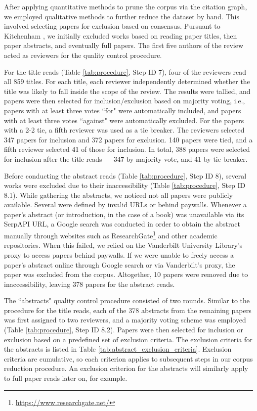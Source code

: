 \documentclass[manuscript,screen,review]{acmart}
\begin{document}
After applying quantitative methods to prune the corpus via the citation graph, we employed qualitative methods to further reduce the dataset by hand. This involved selecting papers for exclusion based on consensus. Pursuant to Kitchenham \cite{kitchenham2004procedures}, we initially excluded works based on reading paper titles, then paper abstracts, and eventually full papers. The first five authors of the review acted as reviewers for the quality control procedure. 

For the title reads (Table \ref{tab:procedure}, Step ID 7), four of the reviewers read all 859 titles. For each title, each reviewer independently determined whether the title was likely to fall inside the scope of the review. The results were tallied, and papers were then selected for inclusion/exclusion based on majority voting, i.e., papers with at least three votes ``for" were automatically included, and papers with at least three votes ``against" were automatically excluded. For the papers with a 2-2 tie, a fifth reviewer was used as a tie breaker. The reviewers selected 347 papers for inclusion and 372 papers for exclusion. 140 papers were tied, and a fifth reviewer selected 41 of those for inclusion. In total, 388 papers were selected for inclusion after the title reads --- 347 by majority vote, and 41 by tie-breaker.

Before conducting the abstract reads (Table \ref{tab:procedure}, Step ID 8), several works were excluded due to their inaccessibility (Table \ref{tab:procedure}, Step ID 8.1). While gathering the abstracts, we noticed not all papers were publicly available. Several were defined by invalid URLs or behind paywalls. Whenever a paper's abstract (or introduction, in the case of a book) was unavailable via its SerpAPI URL, a Google search was conducted in order to obtain the abstract manually through websites such as ResearchGate\footnote{\href{https://www.researchgate.net/}{https://www.researchgate.net/}} and other academic repositories. When this failed, we relied on the Vanderbilt University Library's proxy to access papers behind paywalls. If we were unable to freely access a paper's abstract online through Google search or via Vanderbilt's proxy, the paper was excluded from the corpus. Altogether, 10 papers were removed due to inaccessibility, leaving 378 papers for the abstract reads.

The ``abstracts" quality control procedure consisted of two rounds. Similar to the  procedure for the title reads, each of the 378 abstracts from the remaining papers was first assigned to two reviewers, and a majority voting scheme was employed (Table \ref{tab:procedure}, Step ID 8.2). Papers were then selected for inclusion or exclusion based on a predefined set of exclusion criteria. The exclusion criteria for the abstracts is listed in Table \ref{tab:abstract_exclusion_criteria}. Exclusion criteria are cumulative, so each criterion applies to subsequent steps in our corpus reduction procedure. An exclusion criterion for the abstracts will similarly apply to full paper reads later on, for example.
\end{document}
